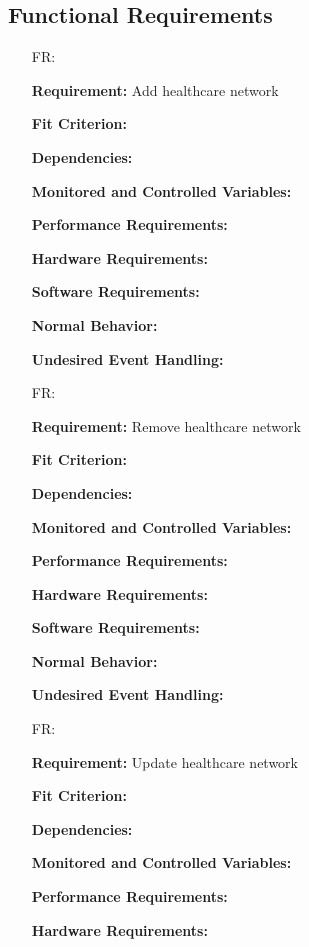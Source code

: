 \documentclass[12pt]{article}
\newcounter{reqnum} %
\begin{document}
\subsection{Functional Requirements} \label{sec_FunctionalRequirements}


\noindent \begin{itemize}

\item[FR\refstepcounter{reqnum}\thereqnum \label{FR_meaningfulLabel}:] 

\textbf{Requirement:} Add healthcare network

\textbf{Fit Criterion:}  

\textbf{Dependencies:}  

\textbf{Monitored and Controlled Variables:} 

\textbf{Performance Requirements:} 

\textbf{Hardware Requirements:} 

\textbf{Software Requirements:} 

\textbf{Normal Behavior:} 

\textbf{Undesired Event Handling:} 


\item[FR\refstepcounter{reqnum}\thereqnum \label{FR_meaningfulLabel}:]  

\textbf{Requirement:} Remove healthcare network 

\textbf{Fit Criterion:}  

\textbf{Dependencies:}  

\textbf{Monitored and Controlled Variables:} 

\textbf{Performance Requirements:} 

\textbf{Hardware Requirements:} 

\textbf{Software Requirements:} 

\textbf{Normal Behavior:} 

\textbf{Undesired Event Handling:} 

\item[FR\refstepcounter{reqnum}\thereqnum \label{FR_meaningfulLabel}:] 

\textbf{Requirement:} Update healthcare network

\textbf{Fit Criterion:}  

\textbf{Dependencies:}  

\textbf{Monitored and Controlled Variables:} 

\textbf{Performance Requirements:} 

\textbf{Hardware Requirements:} 


\end{itemize}
\end{document}
